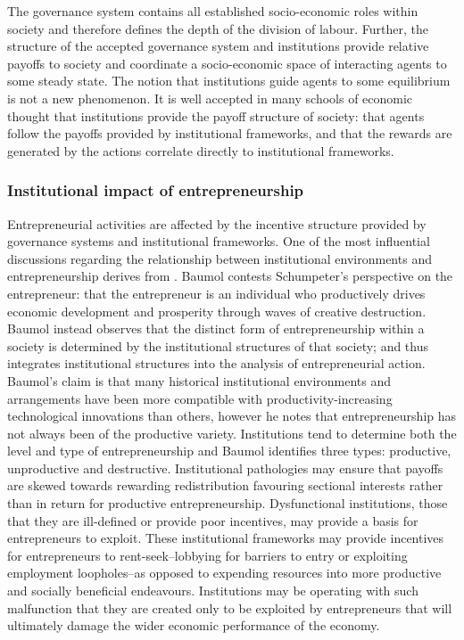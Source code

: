 The governance system contains all established socio-economic roles within society and therefore defines the depth of the division of labour. Further, the structure of the accepted governance system and institutions provide relative payoffs to society and coordinate a socio-economic space of interacting agents to some steady state. The notion that institutions guide agents to some equilibrium is not a new phenomenon. It is well accepted in many schools of economic thought that institutions provide the payoff structure of society: that agents follow the payoffs provided by institutional frameworks, and that the rewards are generated by the actions correlate directly to institutional frameworks.

\subsubsection{Institutional impact of entrepreneurship}

Entrepreneurial activities are affected by the incentive structure provided by governance systems and institutional frameworks. One of the most influential discussions regarding the relationship between institutional environments and entrepreneurship derives from \citet{Baumol1990}. Baumol contests Schumpeter's perspective on the entrepreneur: that the entrepreneur is an individual who productively drives economic development and prosperity through waves of creative destruction. Baumol instead observes that the distinct form of entrepreneurship within a society is determined by the institutional structures of that society; and thus integrates institutional structures into the analysis of entrepreneurial action. Baumol's claim is that many historical institutional environments and arrangements have been more compatible with productivity-increasing technological innovations than others, however he notes that entrepreneurship has not always been of the productive variety. Institutions tend to determine both the level and type of entrepreneurship and Baumol identifies three types: productive, unproductive and destructive. Institutional pathologies may ensure that payoffs are skewed towards rewarding redistribution favouring sectional interests rather than in return for productive entrepreneurship. Dysfunctional institutions, those that they are ill-defined or provide poor incentives, may provide a basis for entrepreneurs to exploit. These institutional frameworks may provide incentives for entrepreneurs to rent-seek--lobbying for barriers to entry or exploiting employment loopholes--as opposed to expending resources into more productive and socially beneficial endeavours. Institutions may be operating with such malfunction that they are created only to be exploited by entrepreneurs that will ultimately damage the wider economic performance of the economy.

